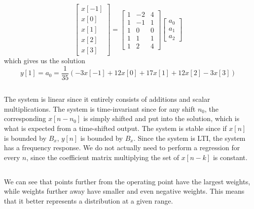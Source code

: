 \documentclass{article}
\begin{document}
\begin{equation}
    \begin{bmatrix}
        x[-1] \\
        x[0] \\
        x[1] \\
        x[2] \\
        x[3]
    \end{bmatrix}
    = 
    \begin{bmatrix}
        1 & -2 & 4 \\
        1 & -1 & 1 \\
        1 & 0 & 0 \\
        1 & 1 & 1 \\
        1 & 2 & 4
    \end{bmatrix}
    \begin{bmatrix}
        a_0 \\
        a_1 \\
        a_2
    \end{bmatrix}
\end{equation}
which gives us the solution
\begin{equation}
    y[1] = a_0 = \frac{1}{35} (-3x[-1] + 12x[0] + 17x[1] + 12x[2] - 3x[3])
\end{equation}

\subsection{}

The system is linear since it entirely consists of additions and scalar multiplications.
The system is time-invariant since for any shift \(n_0\), the corresponding \(x[n - n_0]\) is simply shifted and put into the solution, which is what is expected from a time-shifted output.
The system is stable since if \(x[n]\) is bounded by \(B_x\), \(y[n]\) is bounded by \(B_x\).
Since the system is LTI, the system has a frequency response.
We do not actually need to perform a regression for every \(n\), since the coefficient matrix multiplying the set of \(x[n - k]\) is constant.

\subsection{}

We can see that points further from the operating point have the largest weights, while weights further away have smaller and even negative weights.
This means that it better represents a distribution at a given range.
\end{document}
